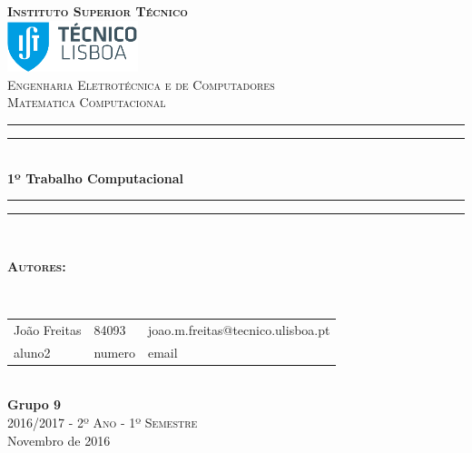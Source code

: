 \documentclass[12pt]{article}
\begin{document}
\begin{titlepage}
	
\thispagestyle{empty}
\newcommand{\HRule}{\rule{\linewidth}{0.5mm}} %
\center
\textsc{\bfseries\LARGE Instituto Superior Técnico}\\[1cm] %
\includegraphics[height=1.5cm]{IST_Logo.eps}\\[2.5cm]
\textsc{\Large Engenharia Eletrotécnica e de Computadores}\\[0.5cm] %
\textsc{\large Matematica Computacional }\\[0.5cm] %

\rule{\textwidth}{1.6pt}\vspace*{-\baselineskip}\vspace*{2pt} %
\rule{\textwidth}{0.4pt}\\[\baselineskip] %

{\Huge \bfseries 1º Trabalho Computacional}\\[0.2cm]

\rule{\textwidth}{0.4pt}\vspace*{-\baselineskip}\vspace{3.2pt} %
\rule{\textwidth}{1.6pt}\\[1.5cm]


\begin{minipage}{0.9\textwidth}
	\begin{flushleft} \large
		\begin{Large}\bfseries\textsc{Autores:}\end{Large}\\[0.4cm]
		\begin{tabular}{l l l} 
			
			João Freitas & 84093 & \normalsize joao.m.freitas@tecnico.ulisboa.pt \\ 
			aluno2 & numero & \normalsize email \\ 
			
		\end{tabular}
	\end{flushleft}
\end{minipage}\\[0.5cm]


{\bfseries Grupo 9}\\[2cm]
\large\textsc{ 2016/2017 - 2º Ano - 1º Semestre}\\
\large Novembro de 2016\\[1cm]


\end{titlepage}
\end{document}
